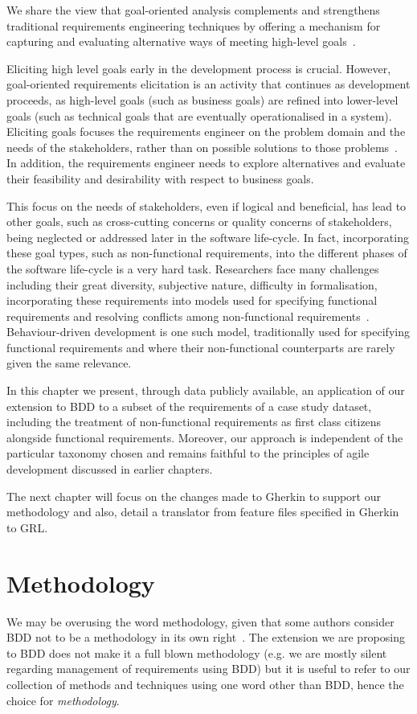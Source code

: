 \documentclass[dissertation,final]{softeng}
\newcommand{\nfrs}{non-functional requirements\xspace}
\begin{document}
We share the view that goal-oriented analysis complements and strengthens traditional requirements engineering techniques by offering a mechanism for capturing and evaluating alternative ways of meeting high-level goals~\citep{MylopoulosExpl2001}.

Eliciting high level goals early in the development process is crucial. However, goal-oriented requirements elicitation is an activity that continues as development proceeds, as high-level goals (such as business goals) are refined into lower-level goals (such as technical goals that are eventually operationalised in a system). Eliciting goals focuses the requirements engineer on the problem domain and the needs of the stakeholders, rather than on possible solutions to those problems~\citep{Nuseibeh:2000ub}. In addition, the requirements engineer needs to explore alternatives and evaluate their feasibility and desirability with respect to business goals.

This focus on the needs of stakeholders, even if logical and beneficial, has lead to other goals, such as cross-cutting concerns or quality concerns of stakeholders, being neglected or addressed later in the software life-cycle. In fact, incorporating these goal types, such as \nfrs, into the different phases of the software life-cycle is a very hard task. Researchers face many challenges including their great diversity,  subjective nature, difficulty in formalisation, incorporating these requirements into models used for specifying functional requirements and resolving conflicts among \nfrs~\citep{Matoussi:2008wr}. Behaviour-driven development is one such model, traditionally used for specifying functional requirements and where their non-functional counterparts are rarely given the same relevance. 

In this chapter we present, through data publicly available, an application of our extension to BDD to a subset of the requirements of a case study dataset, including the treatment of \nfrs as first class citizens alongside functional requirements. Moreover, our approach is independent of the particular taxonomy chosen and remains faithful to the principles of agile development discussed in earlier chapters. 

The next chapter will focus on the changes made to Gherkin to support our methodology and also, detail a translator from feature files specified in Gherkin to GRL.

\section{Methodology}
We may be overusing the word methodology, given that some authors consider BDD not to be a methodology in its own right~\citep{Smart201410}. The extension we are proposing to BDD does not make it a full blown methodology (e.g. we are mostly silent regarding management of requirements using BDD) but it is useful to refer to our collection of methods and techniques using one word other than BDD, hence the choice for \emph{methodology}.
\end{document}
